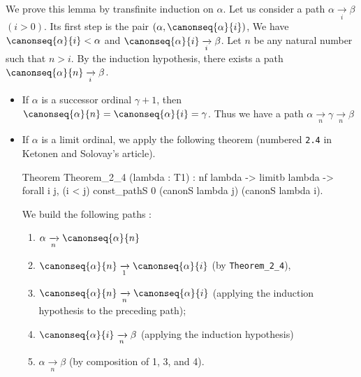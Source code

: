 We prove this lemma by transfinite induction on $\alpha$.
Let us consider a path $\alpha \xrightarrow [i]{} \beta$ $(i>0)$. Its first step is
the pair $(\alpha,\canonseq{\alpha}{i})$, We have $\canonseq{\alpha}{i}<\alpha$ and
$\canonseq{\alpha}{i} \xrightarrow [i]{} \beta$. 
Let $n$ be any natural number such that $n>i$.
By the induction hypothesis, there exists a path $\canonseq{\alpha}{n} \xrightarrow[i]{} \beta$.
\begin{itemize}
\item  If $\alpha$ is a successor ordinal $\gamma+1$, then $\canonseq{\alpha}{n} =
\canonseq{\alpha}{i}=\gamma$. Thus we have a path 
$\alpha  \xrightarrow [n]{}  \gamma \xrightarrow [n]{} \beta$
\item If $\alpha$ is a limit ordinal, we apply the following theorem (numbered \texttt{2.4} in Ketonen and Solovay's article). 



  \begin{Coqsrc}
Theorem Theorem_2_4 (lambda : T1) :
   nf lambda ->
   limitb lambda  ->
   forall i j, (i < j)%
               const_pathS 0 (canonS lambda j)
                             (canonS lambda i). 
  \end{Coqsrc}

 We build the following paths :

 \begin{enumerate}
 \item $\alpha \xrightarrow[n]{} \canonseq{\alpha}{n}$
 \item $\canonseq{\alpha}{n} \xrightarrow[1]{} \canonseq{\alpha}{i}$ (by \texttt{Theorem\_2\_4}),
\item $\canonseq{\alpha}{n} \xrightarrow[n]{} \canonseq{\alpha}{i}$ (applying the induction hypothesis to the preceding path);
\item $\canonseq{\alpha}{i} \xrightarrow[n]{} \beta$ (applying the induction hypothesis)\item $\alpha \xrightarrow[n]{} \beta$ (by composition of 1, 3, and 4).


 \end{enumerate}


\end{itemize}





